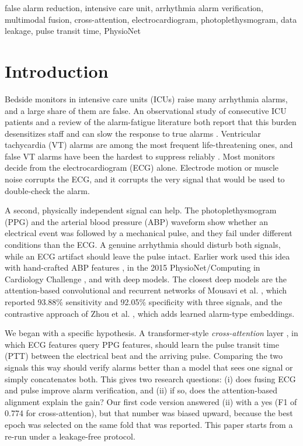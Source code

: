 \documentclass[conference]{IEEEtran}
\begin{document}
\begin{IEEEkeywords}
false alarm reduction, intensive care unit, arrhythmia alarm verification, multimodal fusion, cross-attention, electrocardiogram, photoplethysmogram, data leakage, pulse transit time, PhysioNet
\end{IEEEkeywords}

\section{Introduction}
Bedside monitors in intensive care units (ICUs) raise many arrhythmia alarms, and a large share of them are false. An observational study of consecutive ICU patients and a review of the alarm-fatigue literature both report that this burden desensitizes staff and can slow the response to true alarms \cite{drew2014alarm,cvach2012alarm}. Ventricular tachycardia (VT) alarms are among the most frequent life-threatening ones, and false VT alarms have been the hardest to suppress reliably \cite{lehman2023vtac,clifford2016false}. Most monitors decide from the electrocardiogram (ECG) alone. Electrode motion or muscle noise corrupts the ECG, and it corrupts the very signal that would be used to double-check the alarm.

A second, physically independent signal can help. The photoplethysmogram (PPG) and the arterial blood pressure (ABP) waveform show whether an electrical event was followed by a mechanical pulse, and they fail under different conditions than the ECG. A genuine arrhythmia should disturb both signals, while an ECG artifact should leave the pulse intact. Earlier work used this idea with hand-crafted ABP features \cite{aboukhalil2008abp}, in the 2015 PhysioNet/Computing in Cardiology Challenge \cite{clifford2015challenge,clifford2016false}, and with deep models. The closest deep models are the attention-based convolutional and recurrent networks of Mousavi et al. \cite{mousavi2020attention}, which reported 93.88\% sensitivity and 92.05\% specificity with three signals, and the contrastive approach of Zhou et al. \cite{zhou2022contrastive}, which adds learned alarm-type embeddings.

We began with a specific hypothesis. A transformer-style \emph{cross-attention} layer \cite{vaswani2017attention}, in which ECG features query PPG features, should learn the pulse transit time (PTT) between the electrical beat and the arriving pulse. Comparing the two signals this way should verify alarms better than a model that sees one signal or simply concatenates both. This gives two research questions: (i) does fusing ECG and pulse improve alarm verification, and (ii) if so, does the attention-based alignment explain the gain? Our first code version answered (ii) with a yes (F1 of 0.774 for cross-attention), but that number was biased upward, because the best epoch was selected on the same fold that was reported. This paper starts from a re-run under a leakage-free protocol.
\end{document}
